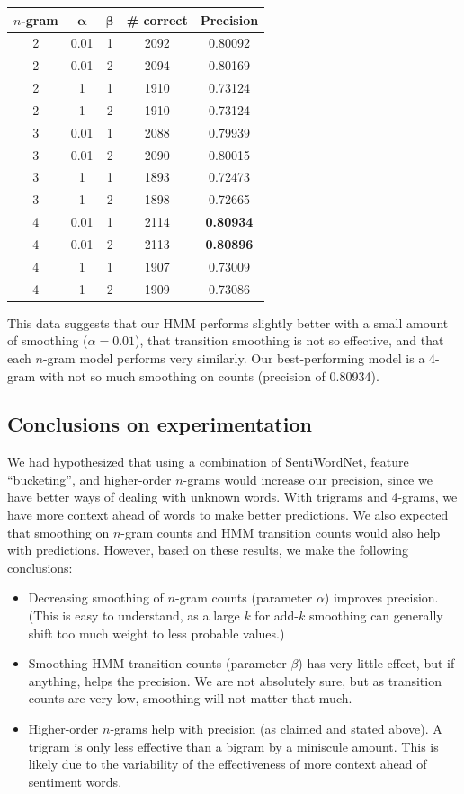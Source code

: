 \documentclass{article}
\begin{document}
{\small\begin{tabular}{|c|c|c|c|c|}\hline
$n$-gram & $\bm{\alpha}$ & $\bm{\beta}$ & \# correct & Precision\\\hline
2 & 0.01 & 1 & 2092 & 0.80092\\
2 & 0.01 & 2 & 2094 & 0.80169\\
2 & 1    & 1 & 1910 & 0.73124\\
2 & 1    & 2 & 1910 & 0.73124\\\hline
3 & 0.01 & 1 & 2088 & 0.79939\\
3 & 0.01 & 2 & 2090 & 0.80015\\
3 & 1    & 1 & 1893 & 0.72473\\
3 & 1    & 2 & 1898 & 0.72665\\\hline
4 & 0.01 & 1 & 2114 & \textbf{0.80934}\\
4 & 0.01 & 2 & 2113 & \textbf{0.80896}\\
4 & 1    & 1 & 1907 & 0.73009\\
4 & 1    & 2 & 1909 & 0.73086\\\hline
\end{tabular}}\par\medskip

This data suggests that our HMM performs slightly better with a small amount of smoothing ($\alpha = 0.01$), that transition smoothing is not so effective, and that each $n$-gram model performs very similarly. Our best-performing model is a 4-gram with not so much smoothing on counts (precision of 0.80934).

\subsection{Conclusions on experimentation}

We had hypothesized that using a combination of SentiWordNet, feature ``bucketing'', and higher-order $n$-grams would increase our precision, since we have better ways of dealing with unknown words. With trigrams and 4-grams, we have more context ahead of words to make better predictions. We also expected that smoothing on $n$-gram counts and HMM transition counts would also help with predictions. However, based on these results, we make the following conclusions:

\begin{itemize}[noitemsep]
  \item Decreasing smoothing of $n$-gram counts (parameter $\alpha$) improves precision. (This is easy to understand, as a large $k$ for add-$k$ smoothing can generally shift too much weight to less probable values.)
  \item Smoothing HMM transition counts (parameter $\beta$) has very little effect, but if anything, helps the precision. We are not absolutely sure, but as transition counts are very low, smoothing will not matter that much.
  \item Higher-order $n$-grams help with precision (as claimed and stated above). A trigram is only less effective than a bigram by a miniscule amount. This is likely due to the variability of the effectiveness of more context ahead of sentiment words.
\end{itemize}
\end{document}
